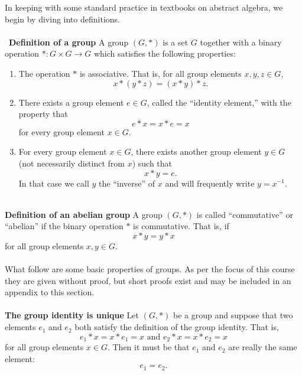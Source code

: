\documentclass[12 pt]{article}
\numberwithin{equation}{section}
\begin{document}
In keeping with some standard practice in textbooks on abstract algebra, we begin by diving into definitions.
\\
\\
\
\textbf{Definition of a group} A group $(G, *)$ is a set $G$ together with a binary operation $*: G \times G \rightarrow G$ which satisfies the following properties:
\begin{enumerate}
\item The operation $*$ is associative. That is, for all group elements $x, y, z \in G$, \begin{equation*}
x*(y*z) = (x*y)*z .
\end{equation*}
\item There exists a group element $e \in G$, called the ``identity element,'' with the property that \begin{equation*}
e * x = x * e = x
\end{equation*}
for every group element $x \in G$.
\item For every group element $x \in G$, there exists another group element $y \in G$ (not necessarily distinct from $x$) such that \begin{equation*}
x * y = e .
\end{equation*}
In that case we call $y$ the ``inverse'' of $x$ and will frequently write $y = x^{-1}$.
\end{enumerate}
\
\\
\textbf{Definition of an abelian group} A group $(G, *)$ is called ``commutative'' or ``abelian'' if the binary operation $*$ is commutative. That is, if \begin{equation*}
x*y = y*x
\end{equation*}
for all group elements $x, y \in G$.
\\
\\
What follow are some basic properties of groups. As per the focus of this course they are given without proof, but short proofs exist and may be included in an appendix to this section.
\\
\\
\textbf{The group identity is unique} Let $(G, *)$ be a group and suppose that two elements $e_1$ and $e_2$ both satisfy the definition of the group identity. That is, \begin{equation*}
e_1 * x = x * e_1 = x \mbox{ and } e_2 * x = x * e_2 = x
\end{equation*}
for all group elements $x \in G$. Then it must be that $e_1$ and $e_2$ are really the same element: \begin{equation*}
e_1 = e_2.
\end{equation*}
\end{document}
